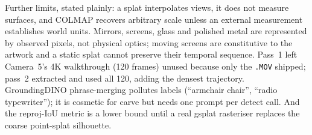 Further limits, stated plainly: a splat interpolates views, it does not measure surfaces, and COLMAP recovers
arbitrary scale unless an external measurement establishes world units. Mirrors, screens, glass and
polished metal are represented by observed pixels, not physical optics; moving screens are
constitutive to the artwork and a static splat cannot preserve their temporal sequence. Pass~1 left Camera~5's 4K walkthrough (120 frames) unused because only the \texttt{.MOV} shipped;
pass~2 extracted and used all 120, adding the densest trajectory. GroundingDINO phrase-merging pollutes labels
(``armchair chair'', ``radio typewriter''); it is cosmetic for carve but needs one prompt per detect
call. And the reproj-IoU metric is a lower bound until a real gsplat rasteriser replaces the coarse
point-splat silhouette.

